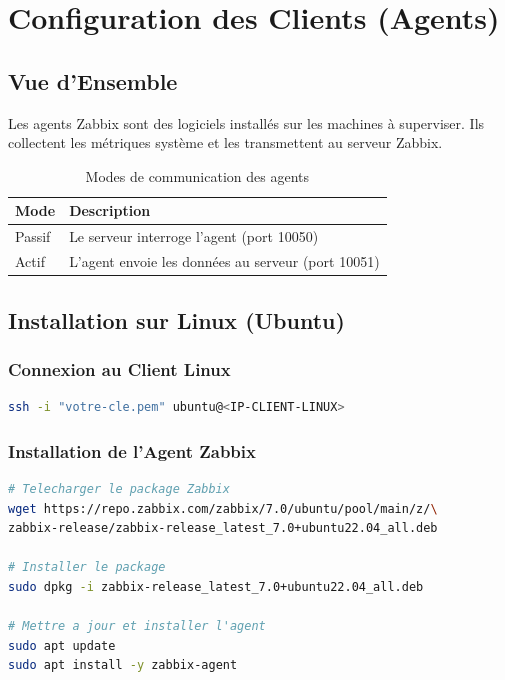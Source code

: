 \chapter{Configuration des Clients (Agents)}
\label{chap:agents}

\section{Vue d'Ensemble}

Les agents Zabbix sont des logiciels installés sur les machines à superviser. Ils collectent les métriques système et les transmettent au serveur Zabbix.

\begin{table}[H]
\centering
\caption{Modes de communication des agents}
\label{tab:agent-modes}
\begin{tabular}{|l|p{10cm}|}
\hline
\textbf{Mode} & \textbf{Description} \\
\hline
Passif & Le serveur interroge l'agent (port 10050) \\
\hline
Actif & L'agent envoie les données au serveur (port 10051) \\
\hline
\end{tabular}
\end{table}

\section{Installation sur Linux (Ubuntu)}

\subsection{Connexion au Client Linux}

\begin{lstlisting}[language=bash, caption=Connexion SSH au client Linux]
ssh -i "votre-cle.pem" ubuntu@<IP-CLIENT-LINUX>
\end{lstlisting}

\subsection{Installation de l'Agent Zabbix}

\begin{lstlisting}[language=bash, caption=Installation de l'agent Zabbix sur Ubuntu]
# Telecharger le package Zabbix
wget https://repo.zabbix.com/zabbix/7.0/ubuntu/pool/main/z/\
zabbix-release/zabbix-release_latest_7.0+ubuntu22.04_all.deb

# Installer le package
sudo dpkg -i zabbix-release_latest_7.0+ubuntu22.04_all.deb

# Mettre a jour et installer l'agent
sudo apt update
sudo apt install -y zabbix-agent
\end{lstlisting}

